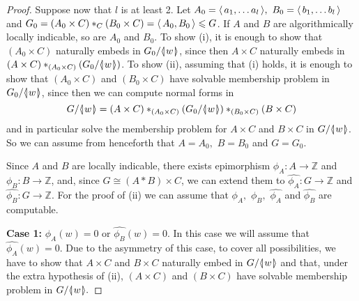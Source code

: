 \documentclass[12pt, a4paper]{amsart}
\theoremstyle{remark}
\theoremstyle{definition}
\begin{document}
\begin{proof}
Suppose now that $l$ is at least 2. Let $A_0={\langle\mkern3mu{a_1,\dots a_l}\mkern3mu\rangle},$  $B_0={\langle\mkern3mu{b_1,\dots b_l}\mkern3mu\rangle}$ and $G_0=(A_0\times C)*_C (B_0\times C)={\langle\mkern3mu{A_0,B_0}\mkern3mu\rangle}\leqslant G$. If $A$ and $B$ are algorithmically locally indicable, so are $A_0$ and $B_0$. To show (i), it is enough to show that $(A_0\times C)$ naturally embeds in $G_0/{{\langle}{\mkern-3.7mu}{\lvert}{\mkern1.2mu}{{w}}{\mkern1.2mu}{\rvert}{\mkern-3.7mu}{\rangle}}$, since then $A\times C$ naturally  embeds in $(A\times C)*_{(A_0\times C)} (G_0/{{\langle}{\mkern-3.7mu}{\lvert}{\mkern1.2mu}{{w}}{\mkern1.2mu}{\rvert}{\mkern-3.7mu}{\rangle}})$. To show (ii), assuming that (i) holds, it is enough to show that $(A_0\times C)$ and $(B_0\times C)$ have  solvable membership problem in $G_0/{{\langle}{\mkern-3.7mu}{\lvert}{\mkern1.2mu}{{w}}{\mkern1.2mu}{\rvert}{\mkern-3.7mu}{\rangle}}$, since then we can compute normal forms in $$G/{{\langle}{\mkern-3.7mu}{\lvert}{\mkern1.2mu}{{w}}{\mkern1.2mu}{\rvert}{\mkern-3.7mu}{\rangle}}=(A\times C)*_{(A_0\times C)} (G_0/{{\langle}{\mkern-3.7mu}{\lvert}{\mkern1.2mu}{{w}}{\mkern1.2mu}{\rvert}{\mkern-3.7mu}{\rangle}})*_{(B_0\times C)} (B\times C)$$ and in particular solve the membership problem for $A\times C$ and $B\times C$ in $G/{{\langle}{\mkern-3.7mu}{\lvert}{\mkern1.2mu}{{w}}{\mkern1.2mu}{\rvert}{\mkern-3.7mu}{\rangle}}$. So we can assume from henceforth that $A=A_0,$ $B=B_0$ and $G=G_0.$ 

Since $A$ and $B$ are locally indicable, there exists epimorphism $\phi_A\colon A\to {\mathbb{Z}}$ and $\phi_B \colon B\to{\mathbb{Z}}$, and, since $G\cong (A*B)\times C$, we can extend them to $\widehat{\phi_A}\colon G\to {\mathbb{Z}}$ and $\widehat{\phi_B}\colon G \to {\mathbb{Z}}$.  For the proof of (ii) we can assume that $\phi_A,$ $\phi_B,$ $\widehat{\phi_A}$ and $\widehat{\phi_B}$  are computable. 

\textbf{Case 1:} $\widehat{\phi_A}(w)=0$ or $\widehat{\phi_B}(w)=0.$
In this case we will assume that $\widehat{\phi_A}(w)=0.$ Due to the asymmetry of this case, to cover all possibilities, we have to show that $A\times C$ and $B\times C$ naturally embed in $G/{{\langle}{\mkern-3.7mu}{\lvert}{\mkern1.2mu}{{w}}{\mkern1.2mu}{\rvert}{\mkern-3.7mu}{\rangle}}$ and that, under the extra hypothesis  of (ii), $(A\times C)$ and $(B\times C)$ have solvable membership problem in $G/{{\langle}{\mkern-3.7mu}{\lvert}{\mkern1.2mu}{{w}}{\mkern1.2mu}{\rvert}{\mkern-3.7mu}{\rangle}}.$


\end{proof}
\end{document}

